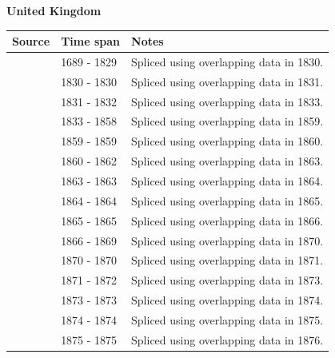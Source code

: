 \documentclass[12pt,a4paper,landscape]{article}
\begin{document}
\begin{adjustbox}{max totalsize={\paperwidth}{\paperheight},center}
\begin{minipage}[t][\textheight][t]{\textwidth}
\vspace*{0.5cm}
{}
\begin{center}
{\Large\bfseries United Kingdom}
\end{center}
\vspace{0.5cm}
\begin{table}[H]
\centering
\small
\begin{tabular}{|l|l|l|}
\hline
\textbf{Source} & \textbf{Time span} & \textbf{Notes} \\
\hline
\rowcolor{white}\cite{CS1_GBR}& 1689 - 1829 &Spliced using overlapping data in 1830.\\
\rowcolor{lightgray}\cite{IMF_FPP}& 1830 - 1830 &Spliced using overlapping data in 1831.\\
\rowcolor{white}\cite{CS1_GBR}& 1831 - 1832 &Spliced using overlapping data in 1833.\\
\rowcolor{lightgray}\cite{IMF_FPP}& 1833 - 1858 &Spliced using overlapping data in 1859.\\
\rowcolor{white}\cite{CS1_GBR}& 1859 - 1859 &Spliced using overlapping data in 1860.\\
\rowcolor{lightgray}\cite{IMF_FPP}& 1860 - 1862 &Spliced using overlapping data in 1863.\\
\rowcolor{white}\cite{CS1_GBR}& 1863 - 1863 &Spliced using overlapping data in 1864.\\
\rowcolor{lightgray}\cite{IMF_FPP}& 1864 - 1864 &Spliced using overlapping data in 1865.\\
\rowcolor{white}\cite{CS1_GBR}& 1865 - 1865 &Spliced using overlapping data in 1866.\\
\rowcolor{lightgray}\cite{IMF_FPP}& 1866 - 1869 &Spliced using overlapping data in 1870.\\
\rowcolor{white}\cite{CS1_GBR}& 1870 - 1870 &Spliced using overlapping data in 1871.\\
\rowcolor{lightgray}\cite{IMF_FPP}& 1871 - 1872 &Spliced using overlapping data in 1873.\\
\rowcolor{white}\cite{CS1_GBR}& 1873 - 1873 &Spliced using overlapping data in 1874.\\
\rowcolor{lightgray}\cite{IMF_FPP}& 1874 - 1874 &Spliced using overlapping data in 1875.\\
\rowcolor{white}\cite{CS1_GBR}& 1875 - 1875 &Spliced using overlapping data in 1876.\\

\end{tabular}
\end{table}
\end{minipage}
\end{adjustbox}
\end{document}
